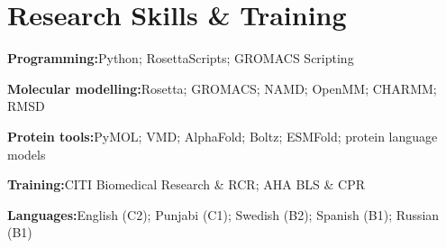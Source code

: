 \documentclass[a4paper,11pt]{article}
\newcommand{\cvsection}[1]{\Needspace{4\baselineskip}\section*{#1}}
\newcommand{\detail}[2]{\textbf{#1}\enspace #2\par}
\begin{document}
\cvsection{Research Skills \& Training}
{\small
  \detail{Programming:}{Python; RosettaScripts; GROMACS Scripting}
  \detail{Molecular modelling:}{Rosetta; GROMACS; NAMD; OpenMM; CHARMM; RMSD}
  \detail{Protein tools:}{PyMOL; VMD; AlphaFold; Boltz; ESMFold; protein language models}
  \detail{Training:}{CITI Biomedical Research \& RCR; AHA BLS \& CPR}
  \detail{Languages:}{English (C2); Punjabi (C1); Swedish (B2); Spanish (B1); Russian (B1)}
}
\end{document}
